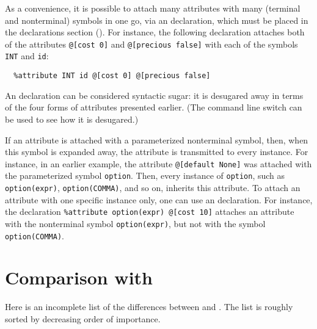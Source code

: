 \documentclass[onecolumn,11pt,nocopyrightspace,preprint]{sigplanconf}
\begin{document}

As a convenience, it is possible to attach many attributes with many (terminal
and nonterminal) symbols in one go, via an \dattribute declaration, which must
be placed in the declarations section ().
For instance, the following declaration attaches both of the attributes
\verb+@[cost 0]+ and \verb+@[precious false]+
with each of the symbols
\verb+INT+ and \verb+id+:
\begin{verbatim}
  %attribute INT id @[cost 0] @[precious false]
\end{verbatim}
An \dattribute declaration can be considered syntactic sugar: it is desugared
away in terms of the four forms of attributes presented earlier. (The command
line switch \oonlypreprocess can be used to see how it is desugared.)


If an attribute is attached with a parameterized nonterminal symbol, then,
when this symbol is expanded away, the attribute is transmitted to every
instance. For instance, in an earlier example, the attribute
\verb+@[default None]+ was attached with the parameterized symbol
\verb+option+. Then, every instance of \verb+option+, such as
\verb+option(expr)+, \verb+option(COMMA)+, and so on, inherits this
attribute. To attach an attribute with one specific
instance only, one can use an \dattribute declaration. For instance,
the declaration \verb+%attribute option(expr) @[cost 10]+ attaches
an attribute with the nonterminal symbol \verb+option(expr)+, but
not with the symbol \verb+option(COMMA)+.


\section{Comparison with \ocamlyacc}


Here is an incomplete list of the differences between \ocamlyacc and \menhir.
The list is roughly sorted by decreasing order of importance.
\end{document}
